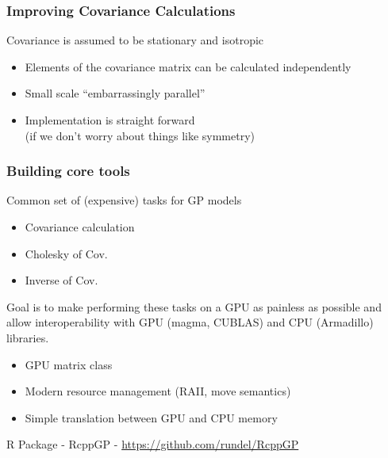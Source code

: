 \documentclass[t]{beamer}\usepackage[]{graphicx}\usepackage[]{color}
\begin{document}
\begin{frame}
\frametitle{Improving Covariance Calculations}
    
Covariance is assumed to be stationary and isotropic
\begin{itemize}
\item Elements of the covariance matrix can be calculated independently
\item Small scale ``embarrassingly parallel''
\item Implementation is straight forward \\ (if we don't worry about things like symmetry)
\end{itemize}

\vfill
\begin{center}
\end{center}
\vfill

\end{frame}





\begin{frame}
\frametitle{Building core tools}

Common set of (expensive) tasks for GP models

\vspace{1mm}

\begin{itemize}
\item Covariance calculation
\item Cholesky of Cov. 
\item Inverse of Cov. 
\end{itemize}

\vspace{2mm}

Goal is to make performing these tasks on a GPU as painless as possible and allow interoperability with GPU (magma, CUBLAS) and CPU (Armadillo) libraries.

\begin{itemize}
\item GPU matrix class
\item Modern resource management (RAII, move semantics)
\item Simple translation between GPU and CPU memory
\end{itemize}

\vfill

R Package - RcppGP - {\small \url{https://github.com/rundel/RcppGP}}

\end{frame}
\end{document}
